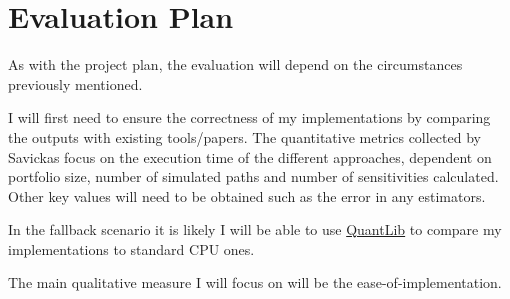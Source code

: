 \chapter{Evaluation Plan}

As with the project plan, the evaluation will depend on the circumstances previously mentioned. 

I will first need to ensure the correctness of my implementations by comparing the outputs with existing tools/papers. The quantitative metrics collected by Savickas focus on the execution time of the different approaches, dependent on portfolio size, number of simulated paths and number of sensitivities calculated. Other key values will need to be obtained such as the error in any estimators.

In the fallback scenario it is likely I will be able to use \href{https://www.quantlib.org/}{QuantLib} to compare my implementations to standard CPU ones.

The main qualitative measure I will focus on will be the ease-of-implementation.